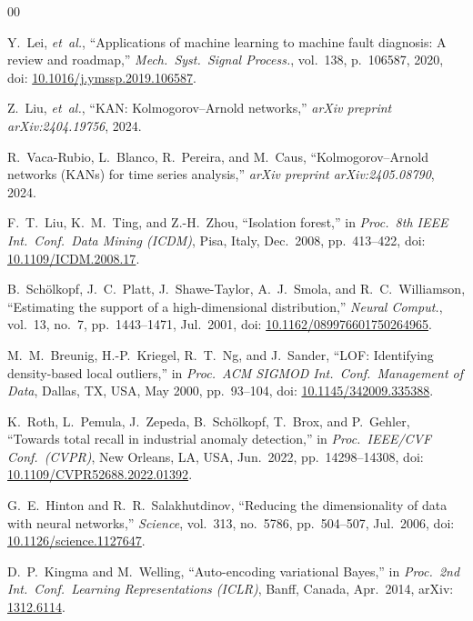 \documentclass[conference]{IEEEtran}
\begin{document}

\begin{thebibliography}{00}

Y.~Lei, \textit{et~al.},
``Applications of machine learning to machine fault diagnosis: A review and roadmap,''
\textit{Mech.\ Syst.\ Signal Process.}, vol.~138, p.~106587, 2020,
doi: \href{https://doi.org/10.1016/j.ymssp.2019.106587}{10.1016/j.ymssp.2019.106587}.

Z.~Liu, \textit{et~al.},
``KAN: Kolmogorov--Arnold networks,''
\textit{arXiv preprint arXiv:2404.19756}, 2024.

R.~Vaca-Rubio, L.~Blanco, R.~Pereira, and M.~Caus,
``Kolmogorov--Arnold networks (KANs) for time series analysis,''
\textit{arXiv preprint arXiv:2405.08790}, 2024.

F.~T.~Liu, K.~M.~Ting, and Z.-H.~Zhou,
``Isolation forest,''
in \textit{Proc.\ 8th IEEE Int.\ Conf.\ Data Mining (ICDM)},
Pisa, Italy, Dec.\ 2008, pp.\ 413--422,
doi: \href{https://doi.org/10.1109/ICDM.2008.17}{10.1109/ICDM.2008.17}.

B.~Sch\"olkopf, J.~C.~Platt, J.~Shawe-Taylor, A.~J.~Smola, and R.~C.~Williamson,
``Estimating the support of a high-dimensional distribution,''
\textit{Neural Comput.}, vol.~13, no.~7, pp.\ 1443--1471, Jul.\ 2001,
doi: \href{https://doi.org/10.1162/089976601750264965}{10.1162/089976601750264965}.

M.~M.~Breunig, H.-P.~Kriegel, R.~T.~Ng, and J.~Sander,
``LOF: Identifying density-based local outliers,''
in \textit{Proc.\ ACM SIGMOD Int.\ Conf.\ Management of Data},
Dallas, TX, USA, May 2000, pp.\ 93--104,
doi: \href{https://doi.org/10.1145/342009.335388}{10.1145/342009.335388}.

K.~Roth, L.~Pemula, J.~Zepeda, B.~Sch\"olkopf, T.~Brox, and P.~Gehler,
``Towards total recall in industrial anomaly detection,''
in \textit{Proc.\ IEEE/CVF Conf.\ (CVPR)},
New Orleans, LA, USA, Jun.\ 2022, pp.\ 14298--14308,
doi: \href{https://doi.org/10.1109/CVPR52688.2022.01392}{10.1109/CVPR52688.2022.01392}.

G.~E.~Hinton and R.~R.~Salakhutdinov,
``Reducing the dimensionality of data with neural networks,''
\textit{Science}, vol.~313, no.~5786, pp.\ 504--507, Jul.\ 2006,
doi: \href{https://doi.org/10.1126/science.1127647}{10.1126/science.1127647}.

D.~P.~Kingma and M.~Welling,
``Auto-encoding variational {B}ayes,''
in \textit{Proc.\ 2nd Int.\ Conf.\ Learning Representations (ICLR)},
Banff, Canada, Apr.\ 2014,
arXiv: \href{https://arxiv.org/abs/1312.6114}{1312.6114}.


\end{thebibliography}
\end{document}
